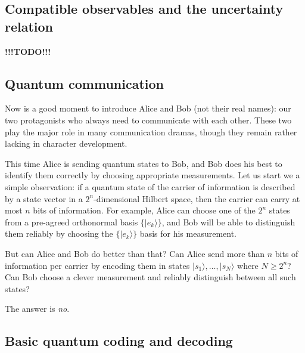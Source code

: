 \documentclass[fleqn]{article}
\begin{document}
\hypertarget{compatible-observables-and-the-uncertainty-relation}{%
\subsection{Compatible observables and the uncertainty relation}\label{compatible-observables-and-the-uncertainty-relation}}

\textbf{!!!TODO!!!}

\hypertarget{quantum-communication}{%
\subsection{Quantum communication}\label{quantum-communication}}

Now is a good moment to introduce Alice and Bob (not their real names): our two protagonists who always need to communicate with each other.
These two play the major role in many communication dramas, though they remain rather lacking in character development.

This time Alice is sending quantum states to Bob, and Bob does his best to identify them correctly by choosing appropriate measurements.
Let us start we a simple observation: if a quantum state of the carrier of information is described by a state vector in a \(2^n\)-dimensional Hilbert space, then the carrier can carry at most \(n\) bits of information.
For example, Alice can choose one of the \(2^n\) states from a pre-agreed orthonormal basis \(\{|e_k\rangle\}\), and Bob will be able to distinguish them reliably by choosing the \(\{|e_k\rangle\}\) basis for his measurement.

But can Alice and Bob do better than that?
Can Alice send more than \(n\) bits of information per carrier by encoding them in states \(|s_1\rangle,\ldots,|s_N\rangle\) where \(N \geqslant 2^n\)?
Can Bob choose a clever measurement and reliably distinguish between all such states?

The answer is \emph{no}.

\hypertarget{basic-quantum-coding-and-decoding}{%
\subsection{Basic quantum coding and decoding}\label{basic-quantum-coding-and-decoding}}
\end{document}

